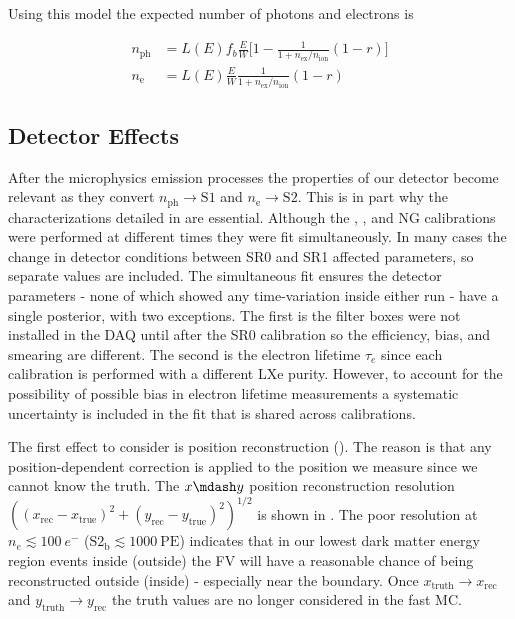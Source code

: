 Using this model the expected number of photons and electrons is

\begin{subequations}
\begin{align}
n_{\mathrm{ph}} &= L(E) f_b \frac{E}{W} \Bigg[1 - \frac{1}{1 + n_{\mathrm{ex}}/n_{\mathrm{ion}}} (1 - r) \Bigg] \\
n_{\mathrm{e}} &= L(E) \frac{E}{W} \frac{1}{1 + n_{\mathrm{ex}}/n_{\mathrm{ion}}} (1 - r)
\end{align}
\end{subequations}



\subsection{Detector Effects}
\label{subsec:er_nr_calibrations_parameter_determ_det_phys}
After the microphysics emission processes the properties of our detector become relevant as they convert
$n_{\mathrm{ph}} \rightarrow \mathrm{S1}$ and $n_{\mathrm{e}} \rightarrow \mathrm{S2}$.  This is in part why the
characterizations detailed in  are essential.  Although the , , and NG calibrations
were performed at different times they were fit simultaneously.  In many cases the change in detector conditions between SR0 and SR1
affected parameters, so separate values are included.  The simultaneous fit ensures the detector parameters - none of which showed any
time-variation inside either run - have a single posterior, with two exceptions.  The first is the filter boxes were not installed in the
DAQ until after the SR0 \ambe calibration so the efficiency, bias, and smearing are different.  The second is the electron lifetime
$\tau_{e}$ since each calibration is performed with a different LXe purity.  However, to account for the possibility of possible bias in
electron lifetime measurements a systematic uncertainty is included in the fit that is shared across calibrations.

The first effect to consider is position reconstruction ().  The reason is that
any position-dependent correction is applied to the position we measure since we cannot know the truth.  The $x \mdash y$ position
reconstruction resolution $((x_{\mathrm{rec}} - x_{\mathrm{true}})^2 + (y_{\mathrm{rec}} - y_{\mathrm{true}})^2)^{1/2}$ is shown in
.  The poor resolution at
$n_e \lesssim 100\ e^-$ ($\mathrm{S2_b} \lesssim 1000\ \mathrm{PE}$) indicates that in our lowest dark matter energy region events inside
(outside) the FV will have a reasonable chance of being reconstructed outside (inside) - especially near the boundary.  Once
$x_{\mathrm{truth}} \rightarrow x_{\mathrm{rec}}$ and
$y_{\mathrm{truth}} \rightarrow y_{\mathrm{rec}}$ the truth values are no longer considered in the fast MC.


